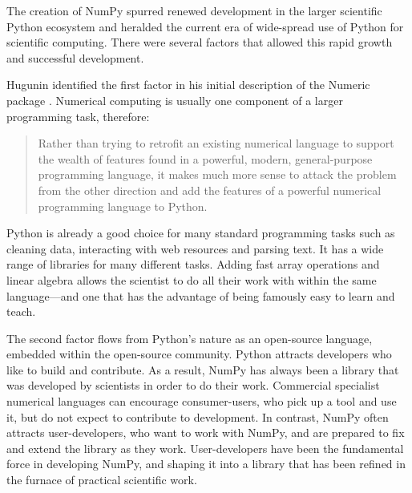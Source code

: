 

The creation of NumPy spurred renewed development in the larger scientific
Python ecosystem and heralded the current era of wide-spread use of Python for
scientific computing.
There were several factors that allowed this rapid growth
and successful development.

Hugunin identified the first factor in his initial description of the Numeric
package \cite{Hugunin-whitepaper}.  Numerical computing is usually one
component of a larger programming task, therefore:
\begin{quote}
    Rather than trying to retrofit an existing numerical language to support
    the wealth of features found in a powerful, modern, general-purpose
    programming language, it makes much more sense to attack the problem from
    the other direction and add the features of a powerful numerical
    programming language to Python.
\end{quote}
Python is already a good choice for many standard programming tasks such as
cleaning data, interacting with web resources and parsing text.  It has a wide
range of libraries for many different tasks. Adding fast array operations and
linear algebra allows the scientist to do all their work with within the same
language---and one that has the advantage of being famously easy to learn and
teach.

The second factor flows from Python's nature as an open-source language,
embedded within the open-source community.  Python attracts developers who like
to build and contribute.  As a result, NumPy has always been a library that was
developed by scientists in order to do their work.  Commercial specialist
numerical languages can encourage consumer-users, who pick up a tool and use
it, but do not expect to contribute to development. %
In contrast, NumPy often
attracts user-developers, who want to work with NumPy, and are prepared to fix
and extend the library as they work. User-developers have been the fundamental
force in developing NumPy, and shaping it into a library that has been refined
in the furnace of practical scientific work.

